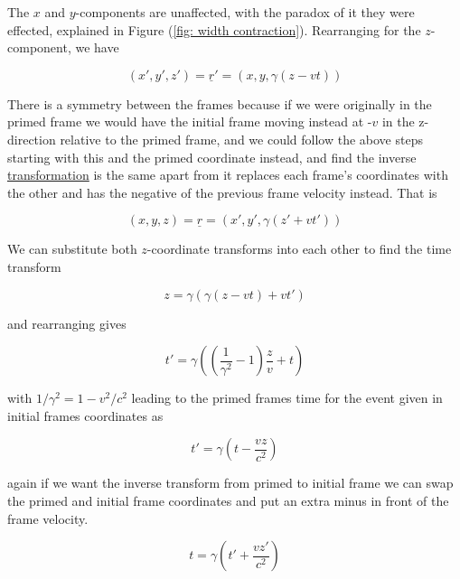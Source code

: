 The $x$ and $y$-components are unaffected, with the paradox of it they were effected, explained in Figure (\ref{fig: width contraction}).
Rearranging for the $z$-component, we have

\begin{equation}
	({x{'}},{y{'}},{z{'}}) = {\underline{r}{'}} = ({x},{y},{\gamma}({z}-{v}{t}) )
\end{equation}

There is a symmetry between the frames because if we were originally in the primed frame we would have the initial frame moving instead at -${v}$ in the z-direction relative to the primed frame, and we could follow the above steps starting with this and the primed coordinate instead, and find the inverse \hyperlink{def-transform}{transformation} is the same apart from it replaces each frame's coordinates with the other and has the negative of the previous frame velocity instead.
That is

\begin{equation}
	({x},{y},{z}) = {\underline{r}} = ({x{'}},{y{'}},{\gamma}({z{'}}+{v}{t{'}}) )
\end{equation}

We can substitute both $z$-coordinate transforms into each other to find the time transform

\begin{equation}
	{z} = {\gamma} ( {\gamma} ({z}-{v}{t}) + {v}{t{'}})
\end{equation}

and rearranging gives

\begin{equation}
	{t{'}} = {\gamma} \left( \left( \dfrac{1}{{\gamma}^2}-1 \right)\frac{z}{v} + t \right)
\end{equation}

with $1/{\gamma}^{2} = 1-{v}^2/{c}^2$ leading to the primed frames time for the event given in initial frames coordinates as

\begin{equation}
	{t{'}} = {\gamma} \left( t-\dfrac{{v}{z}}{{c}^2} \right)
\end{equation}

again if we want the inverse transform from primed to initial frame we can swap the primed and initial frame coordinates and put an extra minus in front of the frame velocity.

\begin{equation}
	{t} = {\gamma} \left( t{'}+\dfrac{{v}{z{'}}}{{c}^2} \right)
\end{equation}

